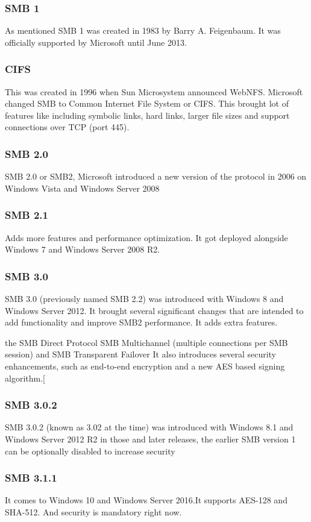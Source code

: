 \documentclass[12pt, letterpaper]{article}
\begin{document}
\subsubsection{SMB 1}
As mentioned SMB 1 was created in 1983 by Barry A. Feigenbaum. It was officially supported by Microsoft until June 2013.
\subsubsection{CIFS}
This was created in 1996 when Sun Microsystem announced WebNFS. Microsoft changed SMB to Common Internet File System or CIFS. This brought lot of features like including symbolic links, hard links, larger file sizes and support connections over TCP (port 445).

\subsubsection{SMB 2.0}
SMB 2.0 or SMB2, Microsoft introduced a new version of the protocol in 2006 on Windows Vista and Windows Server 2008

\subsubsection{SMB 2.1}
Adds more features and performance optimization. It got deployed alongside Windows 7 and Windows Server 2008 R2.

\subsubsection{SMB 3.0}
SMB 3.0 (previously named SMB 2.2) was introduced with Windows 8 and Windows Server 2012. It brought several significant changes that are intended to add functionality and improve SMB2 performance. It adds extra features.

\hfill\break
the SMB Direct Protocol 
SMB Multichannel (multiple connections per SMB session) and
SMB Transparent Failover
It also introduces several security enhancements, such as end-to-end encryption and a new AES based signing algorithm.[

\subsubsection{SMB 3.0.2}
SMB 3.0.2 (known as 3.02 at the time) was introduced with Windows 8.1 and Windows Server 2012 R2 in those and later releases, the earlier SMB version 1 can be optionally disabled to increase security
\subsubsection{SMB 3.1.1}
It comes to Windows 10 and Windows Server 2016.It supports AES-128 and SHA-512. And security is mandatory right now.
\end{document}
